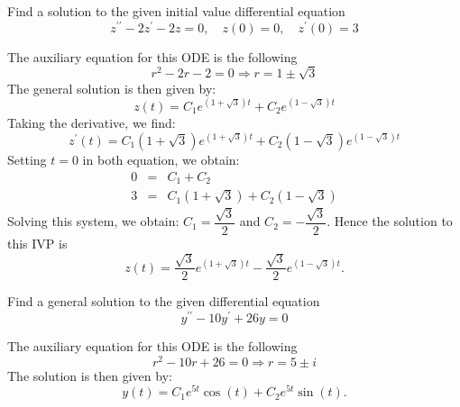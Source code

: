 \documentclass[11pt]{article}
\begin{document}
\begin{problem}
Find a solution to the given initial value differential equation
\begin{equation*}
z^{\prime \prime} -2 z^{\prime} -2z=0, \quad z(0) =0, \quad z^{\prime}(0) = 3
\end{equation*}
\end{problem}
\begin{solution}
The auxiliary equation for this ODE is the following
\begin{equation*}
r^2 -2r -2 =0 \Rightarrow r = 1 \pm \sqrt{3}
\end{equation*}
The general solution is then given by:
\begin{equation*}
z(t) = C_{1} e^{(1 + \sqrt{3}) t} + C_{2} e^{(1 - \sqrt{3})t}
\end{equation*}
Taking the derivative, we find:
\begin{equation*}
z^{\prime}(t) = C_{1}(1 + \sqrt{3}) e^{(1 + \sqrt{3}) t} + C_{2}(1 - \sqrt{3}) e^{(1 - \sqrt{3})t}
\end{equation*}
Setting $t=0$ in both equation, we obtain:
\begin{eqnarray*}
0 &=& C_{1} + C_{2} \\
3 &=& C_{1}(1 + \sqrt{3}) + C_{2}(1 - \sqrt{3})
\end{eqnarray*}
Solving this system, we obtain: $C_{1} = \dfrac{\sqrt{3}}{2}$ and $C_{2} = -\dfrac{\sqrt{3}}{2}$.
Hence the solution to this IVP is
\begin{equation*}
\boxed{ z(t) = \dfrac{\sqrt{3}}{2} e^{(1 + \sqrt{3}) t} - \dfrac{\sqrt{3}}{2} e^{(1 - \sqrt{3})t}}.
\end{equation*}
\end{solution}


\begin{problem}
Find a general solution to the given differential equation
\begin{equation*}
y^{\prime \prime} -10 y^{\prime} +26 y =0
\end{equation*}
\end{problem}
\begin{solution}
The auxiliary equation for this ODE is the following
\begin{equation*}
r^2 -10r +26 =0 \Rightarrow r = 5 \pm i
\end{equation*}
The solution is then given by:
\begin{equation*}
\boxed{ y(t) = C_{1} e^{5 t} \cos(t) + C_{2} e^{5t} \sin(t)}.
\end{equation*}
\end{solution}
\end{document}
